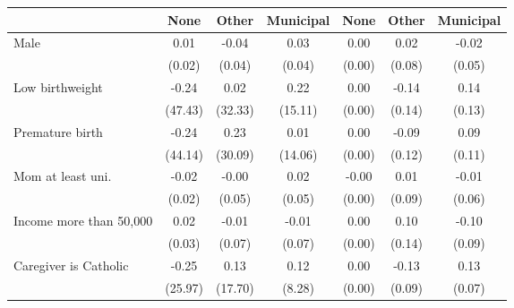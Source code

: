 {
\def\sym#1{\ifmmode^{#1}\else\(^{#1}\)\fi}
\begin{tabular}{l*{6}{c}}
\toprule
                    &\multicolumn{1}{c}{None}&\multicolumn{1}{c}{Other}&\multicolumn{1}{c}{Municipal}&\multicolumn{1}{c}{None}&\multicolumn{1}{c}{Other}&\multicolumn{1}{c}{Municipal}\\
\midrule
Male                &        0.01         &       -0.04         &        0.03         &        0.00         &        0.02         &       -0.02         \\
                    &      (0.02)         &      (0.04)         &      (0.04)         &      (0.00)         &      (0.08)         &      (0.05)         \\
\addlinespace
Low birthweight     &       -0.24         &        0.02         &        0.22         &        0.00         &       -0.14         &        0.14         \\
                    &     (47.43)         &     (32.33)         &     (15.11)         &      (0.00)         &      (0.14)         &      (0.13)         \\
\addlinespace
Premature birth     &       -0.24         &        0.23         &        0.01         &        0.00         &       -0.09         &        0.09         \\
                    &     (44.14)         &     (30.09)         &     (14.06)         &      (0.00)         &      (0.12)         &      (0.11)         \\
\addlinespace
Mom at least uni. &       -0.02         &       -0.00         &        0.02         &       -0.00         &        0.01         &       -0.01         \\
                    &      (0.02)         &      (0.05)         &      (0.05)         &      (0.00)         &      (0.09)         &      (0.06)         \\
\addlinespace
Income more than 50,000 &        0.02         &       -0.01         &       -0.01         &        0.00         &        0.10         &       -0.10         \\
                    &      (0.03)         &      (0.07)         &      (0.07)         &      (0.00)         &      (0.14)         &      (0.09)         \\
\addlinespace
Caregiver is Catholic&       -0.25         &        0.13         &        0.12         &        0.00         &       -0.13         &        0.13         \\
                    &     (25.97)         &     (17.70)         &      (8.28)         &      (0.00)         &      (0.09)         &      (0.07)         \\

\end{tabular}}

